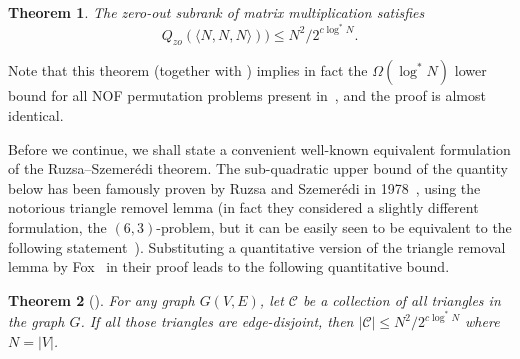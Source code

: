 \documentclass[10pt,a4paper]{article}
\newtheorem{theorem}{Theorem}
\newcommand{\cC}{\mathcal{C}}
\newcommand{\inprod}[1]{\langle #1 \rangle}
\newcommand{\jnote}[1]{\todo[inline, color=blue!30!white]{#1 \\ -\textsc{Jarek}}}
\newcommand{\joshnote}[1]{\todo[inline, color=red!30!white]{#1 \\ -\textsc{Josh}}}
\begin{document}
\begin{theorem}
\label{thm:subrank-triangle-lb}
The zero-out subrank of matrix multiplication satisfies
\begin{equation*}
    Q_{zo}(\inprod{N,N,N})) \leq N^{2}/2^{c \log^* N}.
\end{equation*}
\end{theorem}

Note that this theorem (together with ) implies in fact the $\Omega(\log^* N)$ lower bound for all NOF permutation problems present in~\cite{LPS17}, and the proof is almost identical.



Before we continue, we shall state a convenient well-known equivalent formulation of the Ruzsa–Szemerédi theorem. The sub-quadratic upper bound of the quantity below has been famously proven by Ruzsa and Szemerédi in 1978~\cite{RS78}, using the notorious triangle removel lemma (in fact they considered a slightly different formulation, the $(6,3)$-problem, but it can be easily seen to be equivalent to the following statement~\cite{CEMS91}). Substituting a quantitative version of the triangle removal lemma by Fox~\cite{F11} in their proof leads to the following quantitative bound.  
\begin{theorem}[\cite{RS78,CEMS91,F11}]
\label{thm:ruzsa-szemeredi}
    For any graph $G(V,E)$, let $\cC$ be a collection of all triangles in the graph $G$. If all those triangles are edge-disjoint, then $|\cC| \leq N^2/2^{c \log^* N}$ where $N = |V|$.
\end{theorem}
\end{document}

